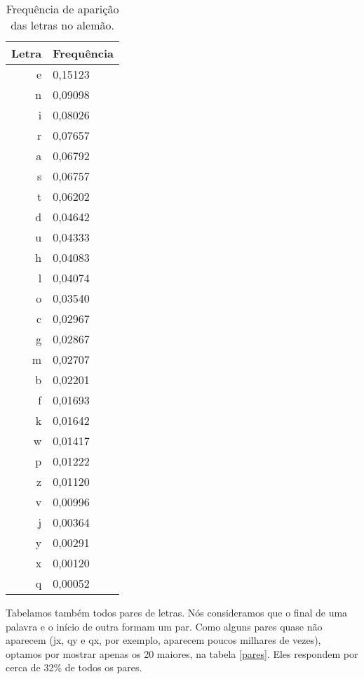 \documentclass{article}
\begin{document}
\begin{table}[h]
    \centering
    \begin{tabular}{r l}
        Letra & Frequência \\\hline
            e & 0,15123 \\
            n & 0,09098 \\
            i & 0,08026 \\
            r & 0,07657 \\
            a & 0,06792 \\
            s & 0,06757 \\
            t & 0,06202 \\
            d & 0,04642 \\
            u & 0,04333 \\
            h & 0,04083 \\
            l & 0,04074 \\
            o & 0,03540 \\
            c & 0,02967 \\
            g & 0,02867 \\
            m & 0,02707 \\
            b & 0,02201 \\
            f & 0,01693 \\
            k & 0,01642 \\
            w & 0,01417 \\
            p & 0,01222 \\
            z & 0,01120 \\
            v & 0,00996 \\
            j & 0,00364 \\
            y & 0,00291 \\
            x & 0,00120 \\
            q & 0,00052 \\
    \end{tabular}
    \caption{Frequência de aparição das letras no alemão.}
    \label{letras}
\end{table}

Tabelamos também todos pares de letras.
Nós consideramos que o final de uma palavra e o início de outra formam um par.
Como alguns pares quase não aparecem
(jx, qy e qx, por exemplo, aparecem poucos milhares de vezes),
optamos por mostrar apenas os 20 maiores,
na tabela \ref{pares}.
Eles respondem por cerca de 32\% de todos os pares.
\end{document}
